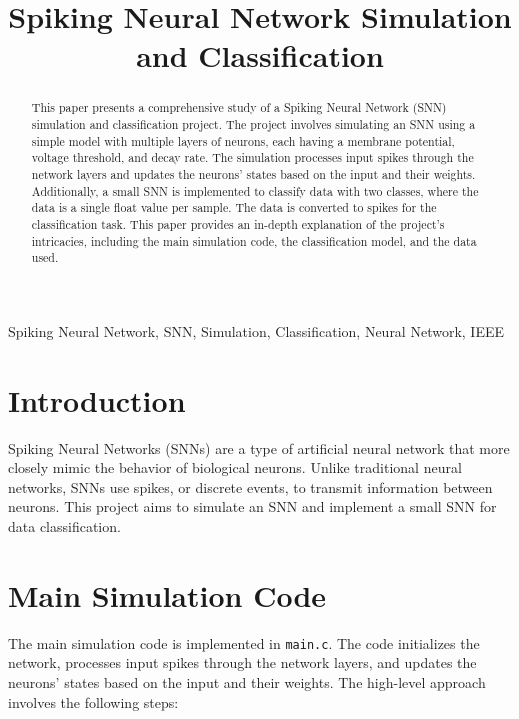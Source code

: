 \documentclass[conference]{IEEEtran}
\begin{document}
\title{Spiking Neural Network Simulation and Classification}

\author{
}

\maketitle

\begin{abstract}
This paper presents a comprehensive study of a Spiking Neural Network (SNN) simulation and classification project. The project involves simulating an SNN using a simple model with multiple layers of neurons, each having a membrane potential, voltage threshold, and decay rate. The simulation processes input spikes through the network layers and updates the neurons' states based on the input and their weights. Additionally, a small SNN is implemented to classify data with two classes, where the data is a single float value per sample. The data is converted to spikes for the classification task. This paper provides an in-depth explanation of the project's intricacies, including the main simulation code, the classification model, and the data used.
\end{abstract}

\begin{IEEEkeywords}
Spiking Neural Network, SNN, Simulation, Classification, Neural Network, IEEE
\end{IEEEkeywords}

\section{Introduction}
Spiking Neural Networks (SNNs) are a type of artificial neural network that more closely mimic the behavior of biological neurons. Unlike traditional neural networks, SNNs use spikes, or discrete events, to transmit information between neurons. This project aims to simulate an SNN and implement a small SNN for data classification.

\section{Main Simulation Code}
The main simulation code is implemented in \texttt{main.c}. The code initializes the network, processes input spikes through the network layers, and updates the neurons' states based on the input and their weights. The high-level approach involves the following steps:
\end{document}

